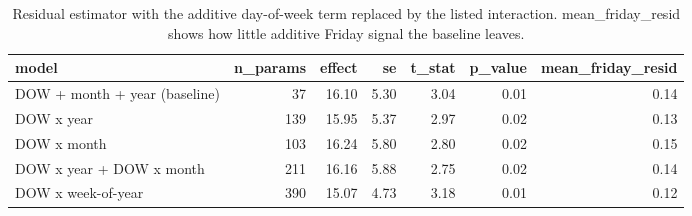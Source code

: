 \begin{table}
\caption{Residual estimator with the additive day-of-week term replaced by the listed interaction. mean\_friday\_resid shows how little additive Friday signal the baseline leaves.}
\begin{tabular}{lrrrrrr}
\toprule
model & n\_params & effect & se & t\_stat & p\_value & mean\_friday\_resid \\
\midrule
DOW + month + year (baseline) & 37 & 16.10 & 5.30 & 3.04 & 0.01 & 0.14 \\
DOW x year & 139 & 15.95 & 5.37 & 2.97 & 0.02 & 0.13 \\
DOW x month & 103 & 16.24 & 5.80 & 2.80 & 0.02 & 0.15 \\
DOW x year + DOW x month & 211 & 16.16 & 5.88 & 2.75 & 0.02 & 0.14 \\
DOW x week-of-year & 390 & 15.07 & 4.73 & 3.18 & 0.01 & 0.12 \\
\bottomrule
\end{tabular}
\end{table}
